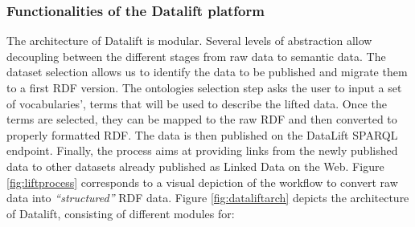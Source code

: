 \subsubsection{Functionalities of the Datalift platform}

The architecture of Datalift is modular. Several levels of abstraction allow decoupling between the different stages from raw data to semantic data. The dataset selection allows us to identify the data to be published and migrate them to a first RDF version. The ontologies selection step asks the user to input a set of vocabularies', terms that will be used to describe the lifted data. Once the terms are selected, they can be mapped to the raw RDF and then converted to properly formatted RDF. The data is then published on the DataLift SPARQL endpoint. Finally, the process aims at providing links from the newly published data to other datasets already published as Linked Data on the Web. Figure \ref{fig:liftprocess} corresponds to a visual depiction of the workflow to convert raw data into \textit{``structured''} RDF data. Figure \ref{fig:dataliftarch} depicts the architecture of Datalift, consisting of different modules for:

\begin{figure}[ht!b]
\end{figure}


